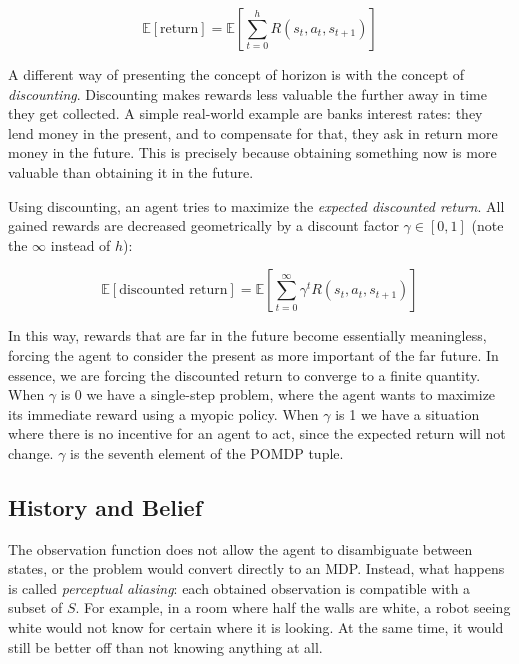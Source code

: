 
\[ \mathbb{E}[\text{return}] = \mathbb{E} \left [ \sum_{t=0}^{h} R(s_t, a_t, s_{t+1}) \right ] \]

A different way of presenting the concept of horizon is with the concept of \textit{discounting}.
Discounting makes rewards less valuable the further away in time they get collected. A simple
real-world example are banks interest rates: they lend money in the present, and to compensate for
that, they ask in return more money in the future. This is precisely because obtaining something now
is more valuable than obtaining it in the future.

Using discounting, an agent tries to maximize the \textit{expected discounted return}. All gained rewards are
decreased geometrically by a discount factor $\gamma \in [0,1]$ (note the $\infty$ instead of $h$):

\[ \mathbb{E}[\text{discounted return}] = \mathbb{E} \left [ \sum_{t=0}^{\infty} \gamma^t R(s_t,
a_t, s_{t+1}) \right ] \]

In this way, rewards that are far in the future become essentially meaningless, forcing the agent to
consider the present as more important of the far future. In essence, we are forcing the discounted
return to converge to a finite quantity. When $\gamma$ is 0 we have a single-step problem, where the
agent wants to maximize its immediate reward using a myopic policy. When $\gamma$ is 1 we
have a situation where there is no incentive for an agent to act, since the expected return will not
change. $\gamma$ is the seventh element of the POMDP tuple.

\subsection{History and Belief}

The observation function does not allow the agent to disambiguate between states, or the problem
would convert directly to an MDP. Instead, what happens is called \textit{perceptual aliasing}: each
obtained observation is compatible with a subset of $S$. For example, in a room where half the walls
are white, a robot seeing white would not know for certain where it is looking. At the same time, it
would still be better off than not knowing anything at all.

